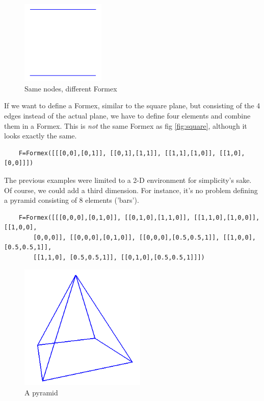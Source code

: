 \begin{figure}[ht]
  \centering
  \begin{makeimage}
  \end{makeimage}
  \begin{latexonly}
    \includegraphics[width=4cm]{images/parallel}
  \end{latexonly}
  \begin{htmlonly}
  \end{htmlonly}  
  \caption{Same nodes, different Formex}
\end{figure}

If we want to define a Formex, similar to the square plane, but consisting of the 4 edges instead of the actual plane, we have to define four elements and combine them in a Formex. This is \emph{not} the same Formex as fig \ref{fig:square}, although it looks exactly the same.
\begin{verbatim}
	F=Formex([[[0,0],[0,1]], [[0,1],[1,1]], [[1,1],[1,0]], [[1,0],[0,0]]])
\end{verbatim}

The previous examples were limited to a 2-D environment for simplicity's sake. Of course, we could add a third dimension. For instance, it's no problem defining a pyramid consisting of 8 elements ('bars').
\begin{verbatim}
	F=Formex([[[0,0,0],[0,1,0]], [[0,1,0],[1,1,0]], [[1,1,0],[1,0,0]], [[1,0,0], 
		[0,0,0]], [[0,0,0],[0,1,0]], [[0,0,0],[0.5,0.5,1]], [[1,0,0],[0.5,0.5,1]], 
		[[1,1,0], [0.5,0.5,1]], [[0,1,0],[0.5,0.5,1]]])
\end{verbatim}

\begin{figure}[ht]
  \centering
  \begin{makeimage}
  \end{makeimage}
  \begin{latexonly}
    \includegraphics[width=6cm]{images/pyramide}
  \end{latexonly}
  \begin{htmlonly}
  \end{htmlonly}  
  \caption{A pyramid}
  \label{fig:pyramid}
\end{figure}

